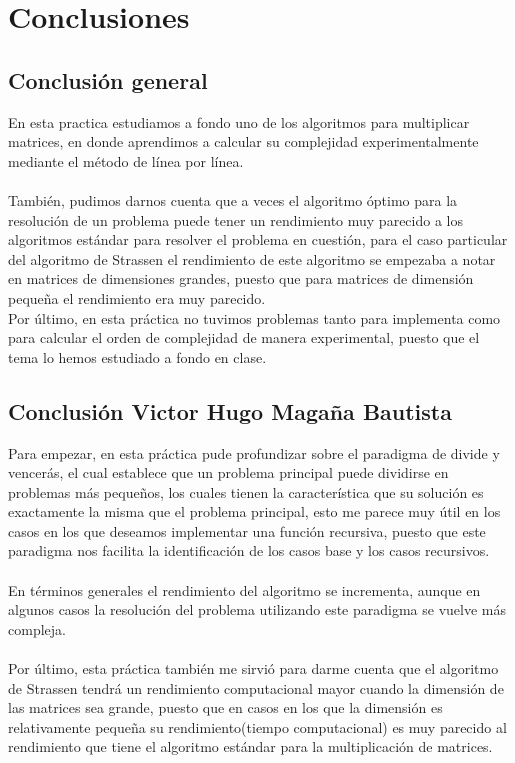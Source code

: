 \documentclass[12pt,twoside]{article}
\begin{document}
\section{Conclusiones}

\subsection{\textbf{Conclusión general}}
En esta practica estudiamos a fondo uno de los algoritmos para multiplicar matrices, en donde aprendimos a calcular su complejidad experimentalmente mediante el método de línea por línea.
\\\\
También, pudimos darnos cuenta que a veces el algoritmo óptimo para la resolución de un problema puede tener un rendimiento muy parecido a los algoritmos estándar para resolver el problema en cuestión, para el caso particular del algoritmo de Strassen el rendimiento de este algoritmo se empezaba a notar en matrices de dimensiones grandes, puesto que para matrices de dimensión pequeña el rendimiento era muy parecido.
\\
Por último, en esta práctica no tuvimos problemas tanto para implementa como para calcular el orden de complejidad de manera experimental, puesto que el tema lo hemos estudiado a fondo en clase.


\subsection{\textbf{Conclusión Victor Hugo Magaña Bautista}}

Para  empezar, en esta práctica pude profundizar sobre el paradigma de divide y vencerás, el cual establece que un problema principal puede dividirse en problemas más pequeños, los cuales tienen la característica que su solución es exactamente la misma que el problema principal, esto me parece muy útil en los casos en los que deseamos implementar una función recursiva, puesto que este paradigma nos facilita la identificación de los casos base y los casos recursivos.\\\\
En términos generales el rendimiento del algoritmo se incrementa, aunque en algunos casos la resolución del problema utilizando este paradigma se vuelve más compleja.
\\
\\
Por último, esta práctica también me sirvió para darme cuenta que el algoritmo de Strassen tendrá un rendimiento computacional mayor cuando la dimensión de las matrices sea grande, puesto que en casos en los que la dimensión es relativamente pequeña su rendimiento(tiempo computacional) es muy parecido al rendimiento que tiene el algoritmo estándar para la multiplicación de matrices.   
\end{document}
